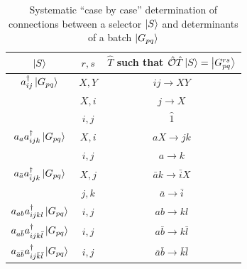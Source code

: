 \documentclass[./thesis.tex]{subfiles}
\begin{document}
\begin{table}

\caption{Systematic ``case by case'' determination of connections between a selector $\ket S$ and determinants of a batch $\ket {G_{pq}}$} 
\label{tab:systematic_determination}
\begin{center}
\begin{minipage}[l]{0.6\textwidth}
        \begin{tabular}{ c|c|c }
                \hline \hline \rule{0pt}{3ex}
                $\ket S$                                                                        &$ r, s$        & $\hat T$ such that ${\hat{\mathcal{O}}} \hat T \ket S = \ket{G^{rs}_{pq}}$     \\
                \hline \hline \rule{0pt}{3ex}
                $a^\dagger_{ij} \ket {G_{pq}}$                                         & $X,Y$         &$ij \rightarrow XY$            \\
                                                                                        & $X,i$         &$j \rightarrow X$              \\
                                                                                        & $i,j$         &$\hat 1$                    \\
                \hline \rule{0pt}{3ex}
                $a_{a} a^\dagger_{ijk} \ket {G_{pq}}$                          &$X,i$          &$aX \rightarrow jk$            \\
                                                                                        &$i,j$          &$a \rightarrow k$              \\
                \hline \rule{0pt}{3ex}
                $a_{\bar a} a^\dagger_{\bar i jk} \ket {G_{pq}}$     &$X,j$          &$\bar a k \rightarrow \bar i X$                \\
                                                                                        &$j,k$          &$\bar a \rightarrow \bar i$            \\
                \hline \rule{0pt}{3ex}
                $a_{ab} a^\dagger_{ijkl} \ket {G_{pq}}$                      &$i,j$          &$ab \rightarrow kl$            \\
                \hline \rule{0pt}{3ex}
                $a_{a  \bar b} a^\dagger_{ijk \bar l} \ket {G_{pq}}$                 &$i,j$          &$a \bar b \rightarrow k \bar l$                \\
                \hline \rule{0pt}{3ex}
                $a_{\bar a \bar b} a^\dagger_{i j \bar k \bar l} \ket {G_{pq}}$      &$i,j$          &$\bar a \bar b \rightarrow \bar k \bar l$              \\
                

\end{tabular}
\end{minipage}
\end{center}
\end{table}
\end{document}
